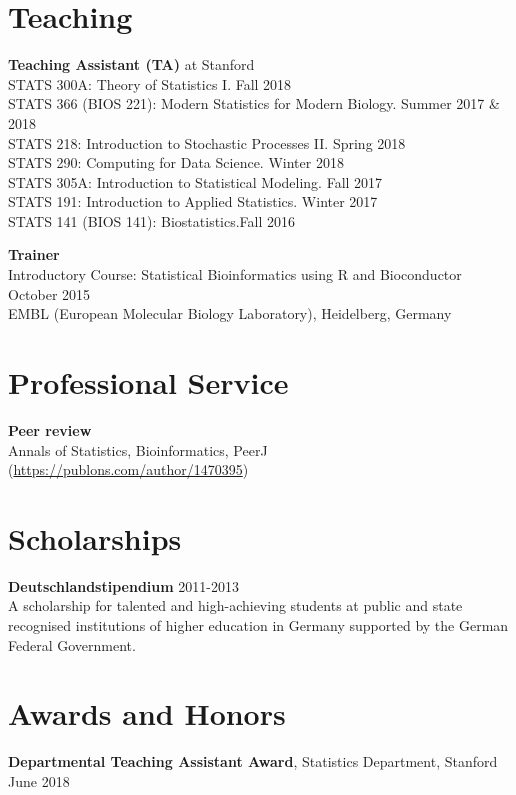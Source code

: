 \documentclass[margin,line]{res}
\newcommand{\ver}{\vspace*{-2.7mm}}
\begin{document}
\begin{resume}
\section{\sc Teaching}

\textbf{Teaching Assistant (TA)} at Stanford\\
STATS 300A: Theory of Statistics I. \hfill Fall 2018\\
STATS 366 (BIOS 221): Modern Statistics for Modern Biology. \hfill Summer 2017 \& 2018\\
STATS 218: Introduction to Stochastic Processes II. \hfill Spring 2018\\
STATS 290: Computing for Data Science. \hfill Winter 2018\\
STATS 305A: Introduction to Statistical Modeling. \hfill Fall 2017\\
STATS 191: Introduction to Applied Statistics. \hfill Winter 2017\\
STATS 141 (BIOS 141): Biostatistics.\hfill Fall 2016

\ver
\textbf{Trainer}\\
Introductory Course: Statistical Bioinformatics using R and Bioconductor \hfill October 2015\\ EMBL (European Molecular Biology Laboratory), Heidelberg, Germany

\section{\sc Professional Service}

\textbf{Peer review}\\
Annals of Statistics, Bioinformatics, PeerJ (\url{https://publons.com/author/1470395})

\section{\sc Scholarships}


\textbf{Deutschlandstipendium} \hfill 2011-2013\\
A scholarship for talented and high-achieving students at public and state recognised institutions of higher education in Germany supported by the German Federal Government.


\section{\sc Awards and Honors}
\textbf{Departmental Teaching Assistant Award}, Statistics Department, Stanford \hfill June 2018


\end{resume}
\end{document}

